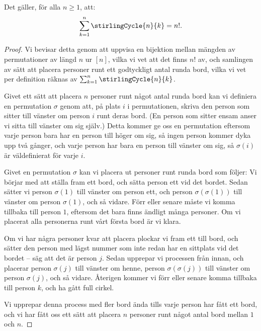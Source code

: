 \documentclass[nobib]{tufte-handout}
\begin{document}
\begin{theorem}
  Det gäller, för alla $n \geq 1$, att: 
  $$\sum_{k=1}^{n} \stirlingCycle{n}{k} = n!.$$

  \begin{proof}
    Vi bevisar detta genom att uppvisa en bijektion mellan mängden av permutationer av längd $n$ ur $[n]$, vilka vi vet att det finns $n!$ av, och samlingen av sätt att placera personer runt ett godtyckligt antal runda bord, vilka vi vet per definition räknas av $\sum_{k=1}^{n} \stirlingCycle{n}{k}$.



    Givet ett sätt att placera $n$ personer runt något antal runda bord kan vi definiera en permutation $\sigma$ genom att, på plats $i$ i permutationen, skriva den person som sitter till vänster om person $i$ runt deras bord. (En person som sitter ensam anser vi sitta till vänster om sig själv.) Detta kommer ge oss en permutation eftersom varje person bara har en person till höger om sig, så ingen person kommer dyka upp två gånger, och varje person har bara en person till vänster om sig, så $\sigma(i)$ är väldefinierat för varje $i$.

    Givet en permutation $\sigma$ kan vi placera ut personer runt runda bord som följer: Vi börjar med att ställa fram ett bord, och sätta person ett vid det bordet. Sedan sätter vi person $\sigma(1)$ till vänster om person ett, och person $\sigma(\sigma(1))$ till vänster om person $\sigma(1)$, och så vidare. Förr eller senare måste vi komma tillbaka till person $1$, eftersom det bara finns ändligt många personer. Om vi placerat alla personerna runt vårt första bord är vi klara.

    Om vi har några personer kvar att placera plockar vi fram ett till bord, och sätter den person med lägst nummer som inte redan har en sittplats vid det bordet -- säg att det är person $j$. Sedan upprepar vi processen från innan, och placerar person $\sigma(j)$ till vänster om henne, person $\sigma(\sigma(j))$ till vänster om person $\sigma(j)$, och så vidare. Återigen kommer vi förr eller senare komma tillbaka till person $k$, och ha gått full cirkel.

    Vi upprepar denna process med fler bord ända tills varje person har fått ett bord, och vi har fått oss ett sätt att placera $n$ personer runt något antal bord mellan $1$ och $n$.


\end{proof}
\end{theorem}
\end{document}

